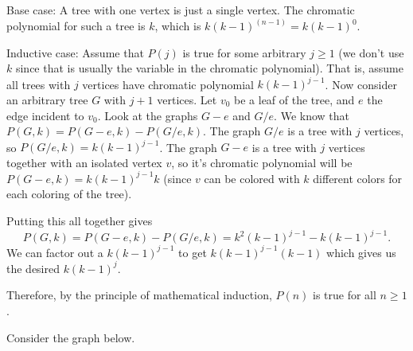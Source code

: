 \documentclass[10pt]{exam}
\def\vertexsize{4 pt}
\newcommand{\vtx}[2]{node[fill,circle,inner sep=0 pt, minimum size=\vertexsize,label=#1:#2]{}}
\newcommand{\vb}[1]{\vtx{below}{#1}}
\newcommand{\vl}[1]{\vtx{left}{#1}}
\begin{document}
\begin{questions}
\begin{solution}
  Base case: A tree with one vertex is just a single vertex.  The chromatic polynomial for such a tree is $k$, which is $k(k-1)^(n-1) = k(k-1)^0$.
  
  Inductive case: Assume that $P(j)$ is true for some arbitrary $j \ge 1$ (we don't use $k$ since that is usually the variable in the chromatic polynomial).  That is, assume all trees with $j$ vertices have chromatic polynomial $k(k-1)^{j-1}$.  Now consider an arbitrary tree $G$ with $j+1$ vertices.  Let $v_0$ be a leaf of the tree, and $e$ the edge incident to $v_0$. Look at the graphs $G-e$ and $G/e$.  We know that $P(G,k) = P(G - e,k) - P(G/e,k)$.  The graph $G/e$ is a tree with $j$ vertices, so $P(G/e,k) = k(k-1)^{j-1}$.  
  The graph $G-e$ is a tree with $j$ vertices together with an isolated vertex $v$, so it's chromatic polynomial will be $P(G-e,k) = k(k-1)^{j-1}k$ (since $v$ can be colored with $k$ different colors for each coloring of the tree). 
  
  Putting this all  together gives
  \[
  P(G,k) = P(G-e,k) - P(G/e,k) = k^2(k-1)^{j-1} - k(k-1)^{j-1}. 
  \]
  We can factor out a $k(k-1)^{j-1}$ to get $k(k-1)^{j-1}(k-1)$ which gives us the desired $k(k-1)^j$.
  
  Therefore, by the principle of mathematical induction, $P(n)$ is true for all $n \ge 1$.
\end{solution}


\question[6] Consider the graph below.

\begin{center}
\end{center}
\end{questions}
\end{document}
